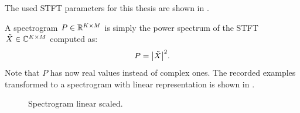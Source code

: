 The used STFT parameters for this thesis are shown in .

A spectrogram $P \in \mathbb{R}^{K \times M}$ is simply the power spectrum of the STFT $\tilde{X} \in \mathbb{C}^{K \times M}$ computed as:
\begin{equation}\label{eq:signal_spec_spec}
  P = \abs{\tilde{X}}^2.
\end{equation}
Note that $P$ has now real values instead of complex ones.
The recorded examples transformed to a spectrogram with linear representation is shown in .
\begin{figure}[!ht]
  \centering
  \caption{Spectrogram linear scaled.}
  \label{fig:signal_spec_lin_showcase}
\end{figure}
